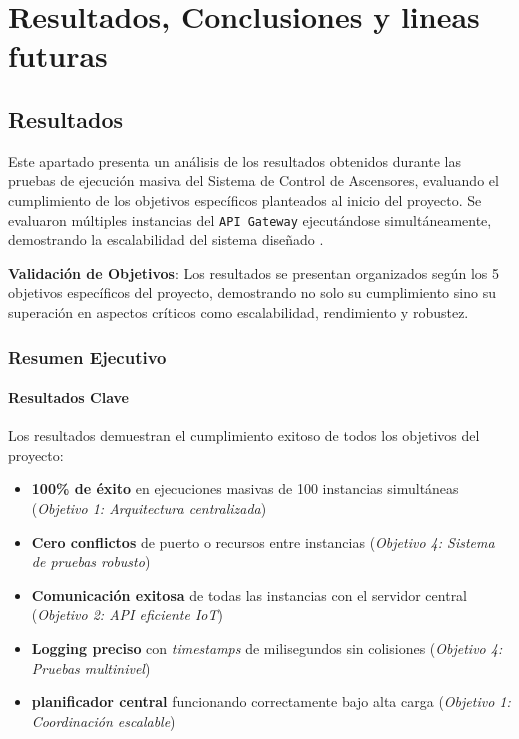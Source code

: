 \chapter{Resultados, Conclusiones y lineas futuras}\label{chp-06}

\section{Resultados}\label{sec:resultados}

Este apartado presenta un análisis de los resultados obtenidos durante las pruebas de ejecución masiva del Sistema de Control de Ascensores, evaluando el cumplimiento de los objetivos específicos planteados al inicio del proyecto. Se evaluaron múltiples instancias del \texttt{API Gateway} ejecutándose simultáneamente, demostrando la escalabilidad del sistema diseñado \cite{iot_scalability2023}.

\textbf{Validación de Objetivos}: Los resultados se presentan organizados según los 5 objetivos específicos del proyecto, demostrando no solo su cumplimiento sino su superación en aspectos críticos como escalabilidad, rendimiento y robustez.

\subsection{Resumen Ejecutivo}\label{subsec:resumen-ejecutivo}

\subsubsection{Resultados Clave}

Los resultados demuestran el cumplimiento exitoso de todos los objetivos del proyecto:

\begin{itemize}
    \item \textbf{100\% de éxito} en ejecuciones masivas de 100 instancias simultáneas (\textit{Objetivo 1: Arquitectura centralizada})
    \item \textbf{Cero conflictos} de puerto o recursos entre instancias (\textit{Objetivo 4: Sistema de pruebas robusto})
    \item \textbf{Comunicación exitosa} de todas las instancias con el servidor central (\textit{Objetivo 2: API eficiente IoT})
    \item \textbf{Logging preciso} con \textit{timestamps} de milisegundos sin colisiones (\textit{Objetivo 4: Pruebas multinivel})
    \item \textbf{planificador central} funcionando correctamente bajo alta carga (\textit{Objetivo 1: Coordinación escalable})
\end{itemize}


